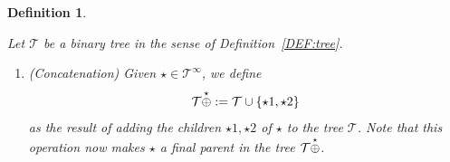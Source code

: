 \documentclass[%
11pt,  reqno]{amsart}
\makeatletter
\newcommand{\5}{\textup{V}}
\newtheorem{definition}[theorem]{Definition}
\theoremstyle{remark}
\newcommand{\TT}{\mathcal{T}}
\def\<#1>{\csname MH@symb@#1\endcsname}
\numberwithin{equation}{section}
\numberwithin{theorem}{section}
\makeatother
\begin{document}
\begin{definition}%
\label{DEF:tree3}
\rm

Let $\TT$ be a binary tree in the sense of Definition~\ref{DEF:tree}. 


\begin{enumerate}






\smallskip
\item[(i)] (Concatenation) 
Given $ \star \in \TT^\infty$, we define
$$
\TT \overset{\star}{\oplus} \<1>
: = \TT \cup \{\star1, \star2\}
$$
as the result of adding the children $\star1,\star2$ of $\star$ to the tree $\TT$. 
Note that this operation now makes $\star$ a final parent in the tree $\TT \overset{\star}{\oplus} \<1>$. 





\end{enumerate}
\end{definition}
\end{document}
